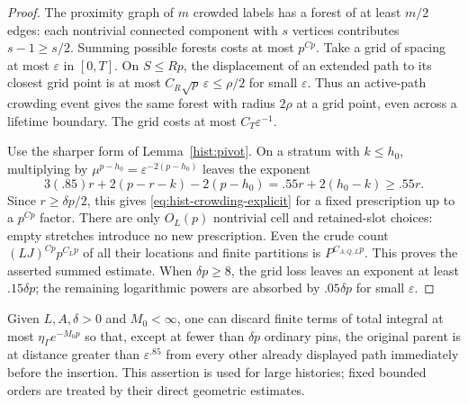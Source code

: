 \begin{proof}
The proximity graph of $m$ crowded labels has a forest of at least
$m/2$ edges: each nontrivial connected component with $s$ vertices
contributes $s-1\geq s/2$.  Summing possible forests costs at most
$p^{Cp}$.  Take a grid of spacing at most $\varepsilon$ in $[0,T]$.
On $S\leq Rp$, the displacement of an extended path to its closest
grid point is at most $C_R\sqrt p\,\varepsilon\leq\rho/2$ for
small $\varepsilon$.  Thus an active-path crowding event gives the
same forest with radius $2\rho$ at a grid point, even across a
lifetime boundary.  The grid costs at most $C_T\varepsilon^{-1}$.

Use the sharper form of Lemma~\ref{hist:pivot}.  On a stratum with
$k\leq h_0$, multiplying by
$\mu^{p-h_0}=\varepsilon^{-2(p-h_0)}$ leaves the exponent
\[
 3(.85)r+2(p-r-k)-2(p-h_0)
       =.55r+2(h_0-k)\geq .55r.
\]
Since $r\geq\delta p/2$, this gives
\eqref{eq:hist-crowding-explicit} for a fixed prescription up to a
$p^{Cp}$ factor.  There are only $O_L(p)$ nontrivial cell and
retained-slot choices: empty stretches introduce no new prescription.
Even the crude count $(LJ)^{Cp}p^{C_Lp}$ of all their locations and
finite partitions is $P^{C_{A,Q,L}p}$.  This proves the asserted
summed estimate.  When $\delta p\geq8$, the grid loss leaves an
exponent at least $.15\delta p$; the remaining logarithmic powers
are absorbed by $.05\delta p$ for small $\varepsilon$.
\end{proof}

\begin{corollary}
\label{hist:separated}
Given $L,A,\delta>0$ and $M_0<\infty$, one can discard finite terms
of total integral at most $\eta_\Gamma e^{-M_0p}$ so that, except at
fewer than $\delta p$ ordinary pins, the original parent is at
distance greater than $\varepsilon^{.85}$ from every other already
displayed path immediately before the insertion.  This assertion is
used for large histories; fixed bounded orders are treated by their
direct geometric estimates.
\end{corollary}

